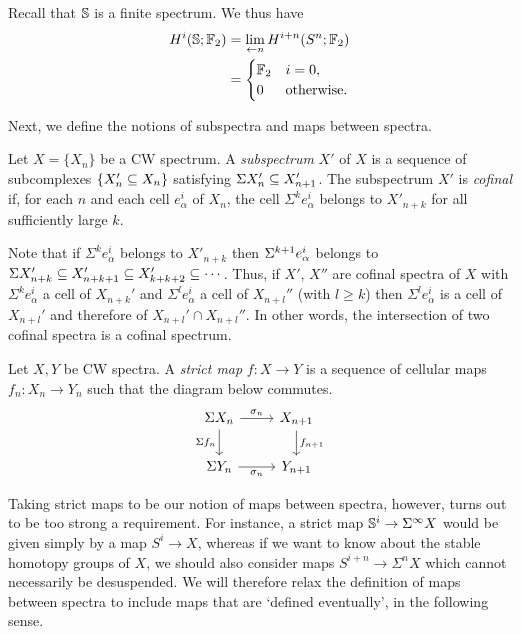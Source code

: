 \documentclass{MetricNotes2023}
\def\bb{\ensuremath\mathbb}
\def\subq{\ensuremath\subseteq}
\def\SIgma{\ensuremath\Sigma}
\begin{document}
\begin{example}
Recall that \(\bb{S}\) is a finite spectrum. We thus have
\begin{align*}
H^i(\bb{S}; \bb{F}_2)&=\lim\limits_{\leftarrow n}H^{i+n}(S^n; \bb{F}_2)\\
&=\begin{cases}
\bb{F}_2 & i = 0,\\
0 & \text{otherwise.}
\end{cases}
\end{align*}
\end{example}

Next, we define the notions of subspectra and maps between spectra.

\begin{definition}
Let \(X=\{X_n\}\) be a CW spectrum. A \textit{subspectrum} \(X'\) of \(X\) is a sequence of subcomplexes \(\{X_n'\subq X_n\}\) satisfying \(\Sigma X_n'\subq X_{n+1}'\). The subspectrum \(X'\) is \textit{cofinal} if, for each \(n\) and each cell \(e^i_\alpha\) of \(X_n\), the cell \(\Sigma^k e_\alpha^i\) belongs to \(X'_{n+k}\) for all sufficiently large \(k\).
\end{definition}

Note that if \(\Sigma^ke^i_\alpha\) belongs to \(X'_{n+k}\) then \(\SIgma^{k+1}e^i_\alpha\) belongs to \(\Sigma X'_{n+k}\subq X'_{n+k+1}\subq X'_{k+k+2}\subq \cdots\). Thus, if \(X'\), \(X''\) are cofinal spectra of \(X\) with \(\Sigma^k e_{\alpha}^i\) a cell of \(X_{n+k}'\) and \(\Sigma^l e_\alpha^i\) a cell of \(X_{n+l}''\) (with \(l\geq k\)) then \(\Sigma^l e_\alpha^i\) is a cell of \(X_{n+l}'\) and therefore of \(X_{n+l}'\cap X_{n+l}''\). In other words, the intersection of two cofinal spectra is a cofinal spectrum.

\begin{definition}
Let \(X, Y\) be CW spectra. A \textit{strict map} \(f : X \to Y\) is a sequence of cellular maps \(f_n : X_n \to Y_n\) such that the diagram below commutes.
\[\begin{tikzcd}
\Sigma X_n \arrow[r, "\sigma_n"] \arrow[d, swap, "\Sigma f_n"]  & X_{n+1} \arrow[d, "f_{n+1}"]  \\
\SIgma Y_n \arrow[r, swap, "\sigma_n"]  & Y_{n+1}
\end{tikzcd}\]
\end{definition}

Taking strict maps to be our notion of maps between spectra, however, turns out to be too strong a requirement. For instance, a strict map \(\bb{S}^i \to \Sigma^\infty X\) would be given simply by a map \(S^i \to X\), whereas if we want to know about the stable homotopy groups of \(X\), we should also consider maps \(S^{i+n}\to \Sigma^n X\) which cannot necessarily be desuspended. We will therefore relax the definition of maps between spectra to include maps that are `defined eventually', in the following sense. 
\end{document}
